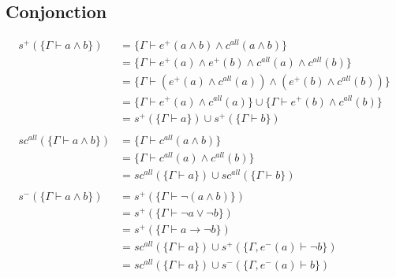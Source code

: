 \documentclass[12pt]{article}
\begin{document}
\subsection*{Conjonction}
\begin{align*}
  s^+ (\{\Gamma \vdash a \land b\})      & = \{\Gamma \vdash e^+(a \land b) \land c^{all}(a \land b)\}                                \\
                                         & = \{\Gamma \vdash e^+(a) \land e^+(b) \land c^{all}(a) \land c^{all}(b)\}                  \\
                                         & = \{\Gamma \vdash (e^+(a) \land c^{all}(a)) \land (e^+(b) \land c^{all}(b))\}              \\
                                         & = \{\Gamma \vdash e^+(a) \land c^{all}(a)\} \cup \{\Gamma \vdash e^+(b) \land c^{all}(b)\} \\
                                         & = s^+ (\{\Gamma \vdash a\}) \cup s^+ (\{\Gamma \vdash b\})                                 \\
  \\
  sc^{all} (\{\Gamma \vdash a \land b\}) & = \{\Gamma \vdash c^{all}(a \land b)\}                                                     \\
                                         & = \{\Gamma \vdash c^{all}(a) \land c^{all}(b)\}                                            \\
                                         & = sc^{all} (\{\Gamma \vdash a\}) \cup sc^{all} (\{\Gamma \vdash b\})                       \\
  \\
  s^- (\{\Gamma \vdash a \land b\})      & = s^+ (\{\Gamma\vdash\neg (a \land b)\})                                                   \\
                                         & = s^+ (\{\Gamma\vdash\neg a \lor \neg b\})                                                 \\
                                         & = s^+ (\{\Gamma\vdash a \rightarrow \neg b\})                                              \\
                                         & = sc^{all} (\{\Gamma \vdash a\}) \cup s^+ (\{\Gamma, e^- (a)\vdash \neg b\})               \\
                                         & = sc^{all} (\{\Gamma \vdash a\}) \cup s^- (\{\Gamma, e^- (a)\vdash b\})                    \\
\end{align*}
\end{document}
